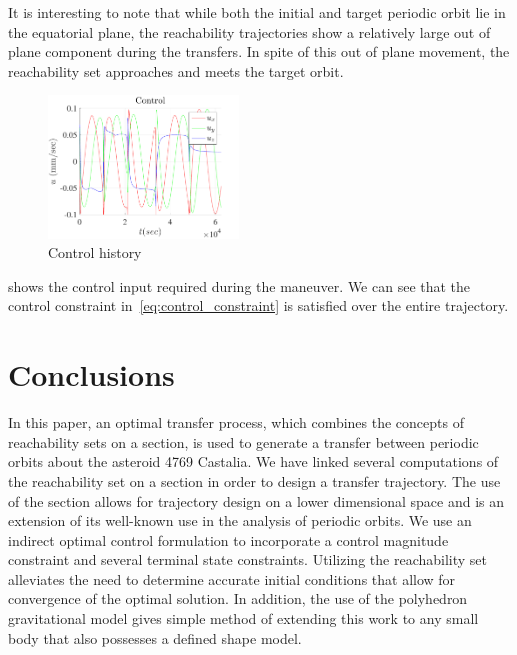 \documentclass[]{aiaa-tc}%
\begin{document}
It is interesting to note that while both the initial and target periodic orbit lie in the equatorial plane, the reachability trajectories show a relatively large out of plane component during the transfers.
In spite of this out of plane movement, the reachability set approaches and meets the target orbit. 
\begin{figure}
    \centering
    \includegraphics[width=0.45\textwidth]{figures/control.pdf}
    \caption{Control history \label{fig:control}}
\end{figure}
 shows the control input required during the maneuver.
We can see that the control constraint in~\cref{eq:control_constraint} is satisfied over the entire trajectory.

\section{Conclusions}\label{sec:conclusions}

In this paper, an optimal transfer process, which combines the concepts of reachability sets on a \Poincare section, is used to generate a transfer between periodic orbits about the asteroid 4769 Castalia.
We have linked several computations of the reachability set on a \Poincare section in order to design a transfer trajectory.
The use of the \Poincare section allows for trajectory design on a lower dimensional space and is an extension of its well-known use in the analysis of periodic orbits.
We use an indirect optimal control formulation to incorporate a control magnitude constraint and several terminal state constraints.
Utilizing the reachability set alleviates the need to determine accurate initial conditions that allow for convergence of the optimal solution.
In addition, the use of the polyhedron gravitational model gives simple method of extending this work to any small body that also possesses a defined shape model.



\end{document}
